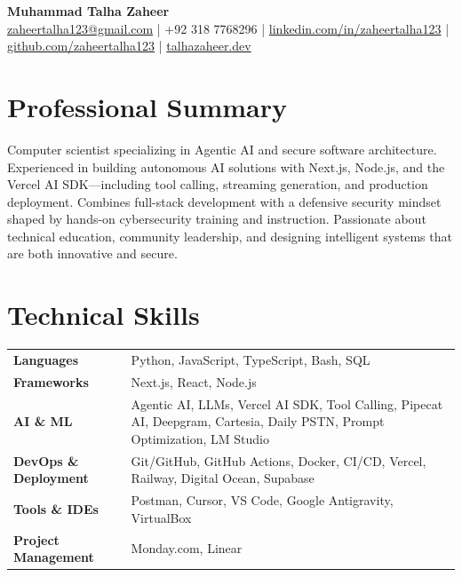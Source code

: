 \documentclass[11pt,a4paper]{article}
\begin{document}
\begin{center}
  {\LARGE \textbf{Muhammad Talha Zaheer}} \\[6pt]
  \href{mailto:zaheertalha123@gmail.com}{zaheertalha123@gmail.com} \;|\;
  +92 318 7768296 \;|\;
  \href{https://www.linkedin.com/in/zaheertalha123}{linkedin.com/in/zaheertalha123} \;|\;
  \href{https://github.com/zaheertalha123}{github.com/zaheertalha123} \;|\;
  \href{https://talhazaheer.dev}{talhazaheer.dev}
\end{center}

\vspace{4pt}

\section{Professional Summary}
Computer scientist specializing in Agentic AI and secure software architecture. Experienced in building autonomous AI solutions with Next.js, Node.js, and the Vercel AI SDK---including tool calling, streaming generation, and production deployment. Combines full-stack development with a defensive security mindset shaped by hands-on cybersecurity training and instruction. Passionate about technical education, community leadership, and designing intelligent systems that are both innovative and secure.

\section{Technical Skills}
\begin{tabularx}{\textwidth}{@{}>{\bfseries}p{1.6in} X@{}}
  Languages &
  Python, JavaScript, TypeScript, Bash, SQL \\
  Frameworks &
  Next.js, React, Node.js \\
  AI \& ML &
  Agentic AI, LLMs, Vercel AI SDK, Tool Calling, Pipecat AI, Deepgram, Cartesia, Daily PSTN, Prompt Optimization, LM Studio \\
  DevOps \& Deployment &
  Git/GitHub, GitHub Actions, Docker, CI/CD, Vercel, Railway, Digital Ocean, Supabase \\
  Tools \& IDEs &
  Postman, Cursor, VS Code, Google Antigravity, VirtualBox \\
  Project Management &
  Monday.com, Linear \\
\end{tabularx}

\end{document}
